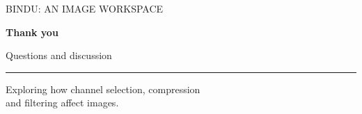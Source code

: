 \documentclass[aspectratio=169,11pt]{beamer}
\begin{document}
{
\begin{frame}[plain]
{\color{Mint}\small BINDU: AN IMAGE WORKSPACE}\par\vspace{10mm}
{\fontsize{36}{40}\selectfont\bfseries Thank you}\par
\vspace{5mm}
{\color{Gold}\Large Questions and discussion}\par
\vspace{8mm}
{\color{Mint}\rule{22mm}{1.2pt}}\par\vspace{4mm}
\large Exploring how channel selection, compression\\and filtering affect images.
\end{frame}
}
\end{document}
